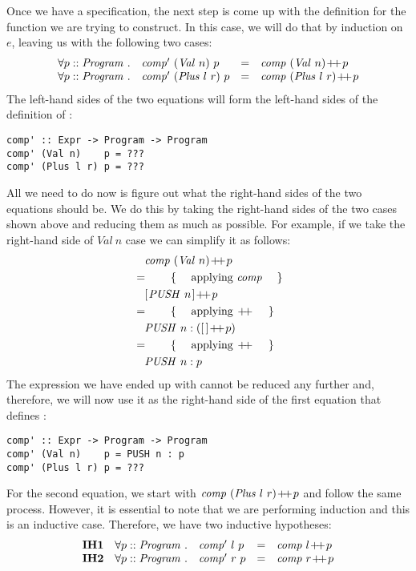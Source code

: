 Once we have a specification, the next step is come up with the definition for the function we are trying to construct. In this case, we will do that by induction on $e$, leaving us with the following two cases:
\begin{displaymath}
\begin{array}{lcl}
\forall p :: \mathit{Program} ~.\quad \mathit{comp'}~(\mathit{Val}~n)~p & = & \mathit{comp}~(\mathit{Val}~n) \append p \\
\forall p :: \mathit{Program} ~.\quad \mathit{comp'}~(\mathit{Plus}~l~r)~p & = & \mathit{comp}~(\mathit{Plus}~l~r) \append p 
\end{array}
\end{displaymath}
The left-hand sides of the two equations will form the left-hand sides of the definition of :
\begin{verbatim}
comp' :: Expr -> Program -> Program 
comp' (Val n)    p = ???
comp' (Plus l r) p = ???
\end{verbatim}
All we need to do now is figure out what the right-hand sides of the two equations should be. We do this by taking the right-hand sides of the two cases shown above and reducing them as much as possible. For example, if we take the right-hand side of $\mathit{Val}~n$ case we can simplify it as follows: 
\begin{align*}
\expr{\mathit{comp}~(\mathit{Val}~n) \append p}
\hint{applying $\mathit{comp}$}
\expr{\hslist{\mathit{PUSH}~n} \append p}
\hint{applying $\append$}
\expr{\mathit{PUSH}~n : (\hslist{} \append p)}
\hint{applying $\append$}
\lastexpr{\mathit{PUSH}~n : p}
\end{align*}
The expression we have ended up with cannot be reduced any further and, therefore, we will now use it as the right-hand side of the first equation that defines :
\begin{verbatim}
comp' :: Expr -> Program -> Program 
comp' (Val n)    p = PUSH n : p
comp' (Plus l r) p = ???
\end{verbatim}
For the second equation, we start with $\mathit{comp}~(\mathit{Plus}~l~r) \append p$ and follow the same process. However, it is essential to note that we are performing induction and this is an inductive case. Therefore, we have two inductive hypotheses:
\begin{displaymath}
\begin{array}{llcl}
\mathbf{IH1} & \forall p :: \mathit{Program} ~.\quad \mathit{comp'}~l~p & = & \mathit{comp}~l \append p \\
\mathbf{IH2} & \forall p :: \mathit{Program} ~.\quad \mathit{comp'}~r~p & = & \mathit{comp}~r \append p 
\end{array}
\end{displaymath}
